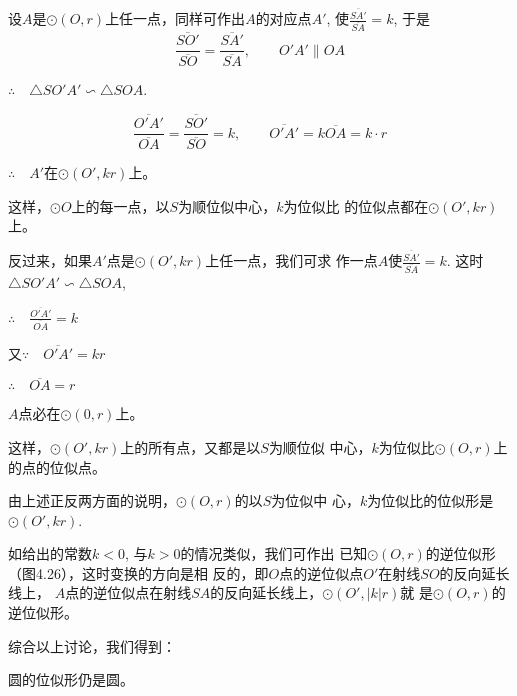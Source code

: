 设$A$是$\odot (O,r)$上任一点，同样可作出$A$的对应点$A'$, 
使$\frac{\overline{SA'}}{\overline{SA}}=k$, 于是
\[\frac{\overline{SO'}}{\overline{SO}}=\frac{\overline{SA'}}{\overline{SA}},\qquad O'A'\parallel OA\]

$\therefore\quad \triangle SO'A'\backsim \triangle SOA$.

\[\frac{\overline{O'A'}}{\overline{OA}}=\frac{\overline{SO'}}{\overline{SO}}=k,\qquad \overline{O'A'}=k\overline{OA}=k\cdot r\]

$\therefore \quad A'$在$\odot (O',kr)$上。

这样，$\odot O$上的每一点，以$S$为顺位似中心，$k$为位似比
的位似点都在$\odot (O',kr)$上。

反过来，如果$A'$点是$\odot (O',kr)$上任一点，我们可求
作一点$A$使$\frac{\overline{SA'}}{\overline{SA}}=k$. 这时$\triangle SO'A'\backsim \triangle SOA$,

$\therefore \quad \frac{\overline{O'A'}}{\overline{OA}}=k$

又$\because\quad \overline{O'A'}=kr$

$\therefore\quad \overline{OA}=r$

$A$点必在$\odot (0,r)$上。

这样，$\odot (O',kr)$上的所有点，又都是以$S$为顺位似
中心，$k$为位似比$\odot (O,r)$上的点的位似点。

由上述正反两方面的说明，$\odot (O,r)$的以$S$为位似中
心，$k$为位似比的位似形是$\odot (O',kr)$.

如给出的常数$k<0$, 与$k>0$的情况类似，我们可作出
已知$\odot (O,r)$的逆位似形（图4.26），这时变换的方向是相
反的，即$O$点的逆位似点$O'$在射线$SO$的反向延长线上，
$A$点的逆位似点在射线$SA$的反向延长线上，$\odot (O',|k|r)$就
是$\odot (O,r)$的逆位似形。

\begin{figure}[htp]
    \centering
    \caption{}
  \end{figure}



综合以上讨论，我们得到：
\begin{blk}{}
    圆的位似形仍是圆。
\end{blk}

